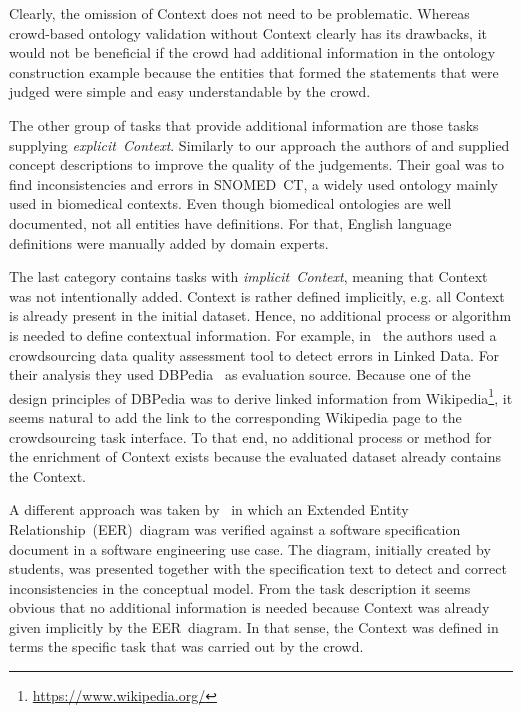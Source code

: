 Clearly, the omission of Context does not need to be problematic. Whereas crowd-based ontology validation without Context clearly has its drawbacks, it would not be beneficial if the crowd had additional information in the ontology construction example because the entities that formed the statements that were judged were simple and easy understandable by the crowd. 

The other group of tasks that provide additional information are those tasks supplying \emph{explicit~Context}. Similarly to our approach the authors of \cite{mortensen2015} and \cite{mortensen2016} supplied concept descriptions to improve the quality of the judgements. Their goal was to find inconsistencies and errors in SNOMED~CT, a widely used ontology mainly used in biomedical contexts. Even though biomedical ontologies are well documented, not all entities have definitions. For that, English language definitions were manually added by domain experts. 

The last category contains tasks with \emph{implicit~Context}, meaning that Context was not intentionally added. Context is rather defined implicitly, e.g. all Context is already present in the initial dataset. Hence, no additional process or algorithm is needed to define contextual information. For example, in~\cite{acosta2018} the authors used a crowdsourcing data quality assessment tool to detect errors in Linked Data. 
For their analysis they used DBPedia~\cite{auer2007} as evaluation source. Because one of the design principles of DBPedia was to derive linked information from Wikipedia\footnote{\url{https://www.wikipedia.org/}}, it seems natural to add the link to the corresponding Wikipedia page to the crowdsourcing task interface. To that end, no additional process or method for the enrichment of Context exists because the evaluated dataset already contains the Context.

A different approach was taken by~\cite{sabou2018, winkler2017, winkler2017_2} in which an Extended Entity Relationship~(EER)~diagram was verified against a software specification document in a software engineering use case. The diagram, initially created by students, was presented together with the specification text to detect and correct inconsistencies in the conceptual model. From the task description it seems obvious that no additional information is needed because Context was already given implicitly by the EER~diagram. In that sense, the Context was defined in terms the specific task that was carried out by the crowd. 

